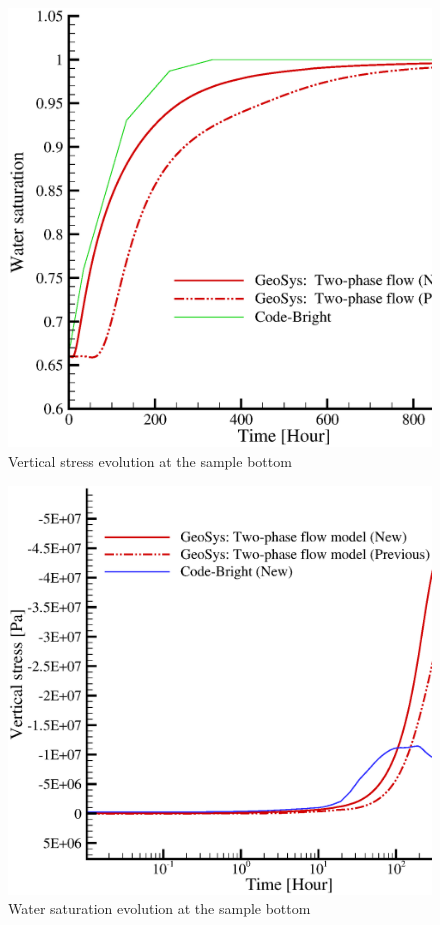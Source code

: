 \begin{figure}[!thb]
\begin{center}
\includegraphics[scale=0.4]{HM/HHM/sat_h2.eps}
\end{center}
\caption{Vertical stress evolution at the sample bottom}
\label{fig:S_top}
\end{figure}

\begin{figure}[!htb]
\begin{center}
\includegraphics[scale=0.4]{HM/HHM/szz_h2.eps}
\end{center}
\caption{Water saturation evolution at the sample bottom}
\label{fig:szz2}
\end{figure}


